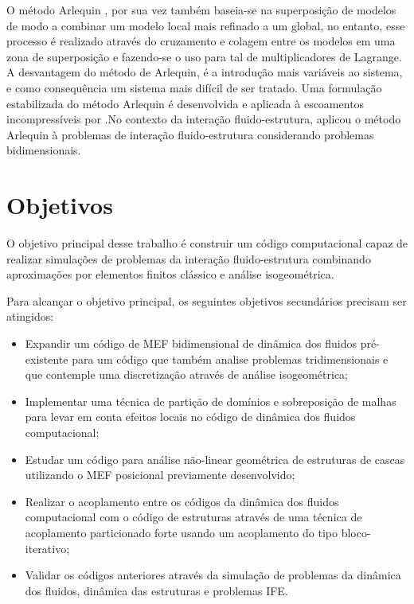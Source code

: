 \documentclass[tese_patricia.tex]{subfiles}
\begin{document}
O método Arlequin \cite{Dhia:1998,DhiaR:2001}, por sua vez também baseia-se na superposição de modelos de modo a combinar um modelo local mais refinado a um global, no entanto, esse processo é realizado através do cruzamento e colagem entre os modelos em uma zona de superposição e fazendo-se o uso para tal de multiplicadores de Lagrange. A desvantagem do método de Arlequin, é a introdução mais variáveis ao sistema, e como consequência um sistema mais difícil de ser tratado. Uma formulação estabilizada do método Arlequin é desenvolvida e aplicada à escoamentos incompressíveis por .No contexto da interação fluido-estrutura,  aplicou o método Arlequin à problemas de interação fluido-estrutura considerando problemas bidimensionais. 


\section[Objetivos]{Objetivos}

O objetivo principal desse trabalho é construir um código computacional capaz de realizar simulações de problemas da interação fluido-estrutura combinando aproximações por elementos finitos clássico e análise isogeométrica.

Para alcançar o objetivo principal, os seguintes objetivos secundários precisam ser atingidos:

\begin{itemize}
	\item Expandir um código de MEF bidimensional de dinâmica dos fluidos pré-existente para um código que também analise problemas tridimensionais e que contemple uma discretização através de análise isogeométrica;
	\item Implementar uma técnica de partição de domínios e sobreposição de malhas para levar em conta efeitos locais no código de dinâmica dos fluidos computacional;
	\item Estudar um código para análise não-linear geométrica de estruturas de cascas utilizando o MEF posicional previamente desenvolvido;
	\item Realizar o acoplamento entre os códigos da dinâmica dos fluidos computacional com o código de estruturas através de uma técnica de acoplamento particionado forte usando um acoplamento do tipo bloco-iterativo;
	\item  Validar os códigos anteriores através da simulação de problemas da dinâmica dos fluidos, dinâmica das estruturas e problemas IFE.
\end{itemize}
\end{document}
